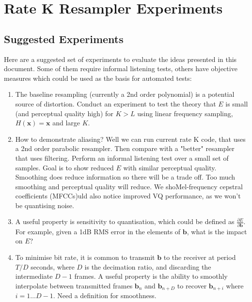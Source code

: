 \documentclass{article}
\begin{document}
\section{Rate K Resampler Experiments}

\subsection{Suggested Experiments}
 
Here are a suggested set of experiments to evaluate the ideas presented in this document.  Some of them require informal listening tests, others have objective measures which could be used as the basis for automated tests:

\begin{enumerate}

\item The baseline resampling (currently a 2nd order polynomial) is a potential source of distortion.  Conduct an experiment to test the theory that $E$ is small (and perceptual quality high) for $K>L$ using linear frequency sampling, $H(\mathbf{x})=\mathbf{x}$ and large $K$.

\item How to demonstrate aliasing?  Well we can run current rate K code, that uses a 2nd order parabolic resampler.  Then compare with a "better" resampler that uses filtering.  Perform an informal listening test over a small set of samples.  Goal is to show reduced $E$ with similar perceptual quality.  Smoothing does reduce information so there will be a trade off.  Too much smoothing and perceptual quality will reduce.  We shoMel-frequency cepstral coefficients (MFCCs)uld also notice improved VQ performance, as we won't be quantising noise.

\item A useful property is sensitivity to quantisation, which could be defined as $\frac{\partial E}{\partial \mathbf{b}}$. For example, given a 1dB RMS error in the elements of $\mathbf{b}$, what is the impact on $E$?

\item To minimise bit rate, it is common to transmit $\mathbf{b}$ to the receiver at period $T/D$ seconds, where $D$ is the decimation ratio, and discarding the intermediate $D-1$ frames. A useful property is the ability to smoothly interpolate between transmitted frames $\mathbf{b}_n$ and $\mathbf{b}_{n+D}$ to recover $\mathbf{b}_{n+i}$ where $i=1 \ldots D-1$.  Need a definition for smoothness.


\end{enumerate}
\end{document}

